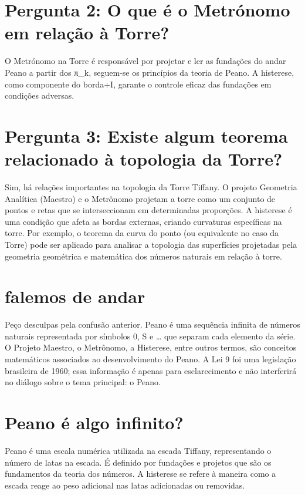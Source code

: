 \documentclass[11pt,a4paper]{article}
\begin{document}
\section{Pergunta 2: O que é o Metrónomo em relação à Torre?}
O Metrónomo na Torre é responsável por projetar e ler as fundações do andar Peano a partir dos π\_k, seguem-se os princípios da teoria de Peano. A histerese, como componente do borda+I, garante o controle eficaz das fundações em condições adversas.

\section{Pergunta 3: Existe algum teorema relacionado à topologia da Torre?}
Sim, há relações importantes na topologia da Torre Tiffany. O projeto Geometria Analítica (Maestro) e o Metrônomo projetam a torre como um conjunto de pontos e retas que se interseccionam em determinadas proporções. A histerese é uma condição que afeta as bordas externas, criando curvaturas específicas na torre. Por exemplo, o teorema da curva do ponto (ou equivalente no caso da Torre) pode ser aplicado para analisar a topologia das superfícies projetadas pela geometria geométrica e matemática dos números naturais em relação à torre.

\section{falemos de andar}
Peço desculpas pela confusão anterior. Peano é uma sequência infinita de números naturais representada por símbolos 0, S e … que separam cada elemento da série. O Projeto Maestro, o Metrônomo, a Histerese, entre outros termos, são conceitos matemáticos associados ao desenvolvimento do Peano. A Lei 9 foi uma legislação brasileira de 1960; essa informação é apenas para esclarecimento e não interferirá no diálogo sobre o tema principal: o Peano.

\section{Peano é algo infinito?}
Peano é uma escala numérica utilizada na escada Tiffany, representando o número de latas na escada. É definido por fundações e projetos que são os fundamentos da teoria dos números. A histerese se refere à maneira como a escada reage ao peso adicional nas latas adicionadas ou removidas.
\end{document}
